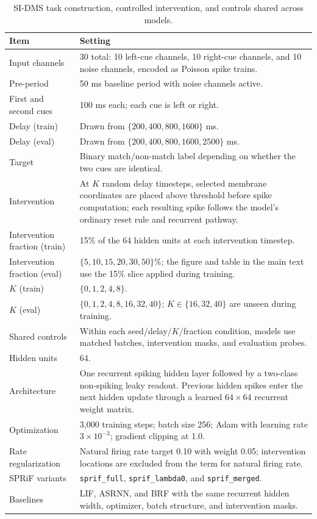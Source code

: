 \documentclass[letterpaper]{article}
\begin{document}
\begin{table}[tbp]
\centering
\small
\setlength{\tabcolsep}{4pt}
\begin{tabular}{p{}p{}}
\toprule
Item & Setting \\
\midrule
Input channels & 30 total: 10 left-cue channels, 10 right-cue channels, and 10 noise channels, encoded as Poisson spike trains. \\
\midrule
Pre-period & 50 ms baseline period with noise channels active. \\
\midrule
First and second cues & 100 ms each; each cue is left or right. \\
\midrule
Delay (train) & Drawn from $\{200,400,800,1600\}$ ms. \\
\midrule
Delay (eval) & Drawn from $\{200,400,800,1600,2500\}$ ms. \\
\midrule
Target & Binary match/non-match label depending on whether the two cues are identical. \\
\midrule
Intervention & At $K$ random delay timesteps, selected membrane coordinates are placed above threshold before spike computation; each resulting spike follows the model's ordinary reset rule and recurrent pathway. \\
\midrule
Intervention fraction (train) & 15\% of the 64 hidden units at each intervention timestep. \\
\midrule
Intervention fraction (eval) & $\{5,10,15,20,30,50\}\%$; the figure and table in the main text use the 15\% slice applied during training. \\
\midrule
$K$ (train) & $\{0,1,2,4,8\}$. \\
\midrule
$K$ (eval) & $\{0,1,2,4,8,16,32,40\}$; $K\in\{16,32,40\}$ are unseen during training. \\
\midrule
Shared controls & Within each seed/delay/$K$/fraction condition, models use matched batches, intervention masks, and evaluation probes. \\
\midrule
Hidden units & 64. \\
\midrule
Architecture & One recurrent spiking hidden layer followed by a two-class non-spiking leaky readout. Previous hidden spikes enter the next hidden update through a learned $64\times64$ recurrent weight matrix. \\
\midrule
Optimization & 3,000 training steps; batch size 256; Adam with learning rate $3\times10^{-3}$; gradient clipping at 1.0. \\
\midrule
Rate regularization & Natural firing rate target 0.10 with weight 0.05; intervention locations are excluded from the term for natural firing rate. \\
\midrule
SPRiF variants & \texttt{sprif\_full}, \texttt{sprif\_lambda0}, and \texttt{sprif\_merged}. \\
\midrule
Baselines & LIF, ASRNN, and BRF with the same recurrent hidden width, optimizer, batch structure, and intervention masks. \\
\bottomrule
\end{tabular}
\caption{SI-DMS task construction, controlled intervention, and controls shared across models.}
\label{tab:supp_sidms}
\end{table}
\end{document}
